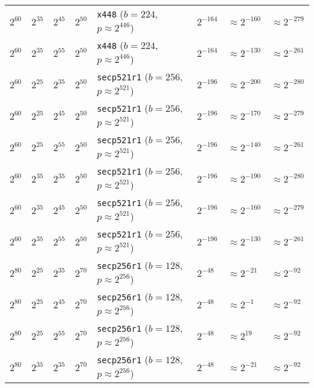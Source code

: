 \begin{table}[p]
{\begin{tabular}{@{}llllllll@{}}
$2^{60}$	&$2^{35}$	&$2^{45}$	&$2^{50}$	&\texttt{x448} ($b \!=\! 224$, \! $p \!\approx\! 2^{446}$)	&$2^{-164}$	&$\approx 2^{-160}$	& \cellcolor{green!25}$\approx 2^{-279}$	\\
$2^{60}$	&$2^{35}$	&$2^{55}$	&$2^{50}$	&\texttt{x448} ($b \!=\! 224$, \! $p \!\approx\! 2^{446}$)	&$2^{-164}$	&$\approx 2^{-130}$	& \cellcolor{green!25}$\approx 2^{-261}$	\\
\midrule
$2^{60}$	&$2^{25}$	&$2^{35}$	&$2^{50}$	&\texttt{secp521r1} ($b \!=\! 256$, \! $p \!\approx\! 2^{521}$)	&$2^{-196}$	&\cellcolor{green!25}$\approx 2^{-200}$	&\cellcolor{green!25}$\approx 2^{-280}$	\\
$2^{60}$	&$2^{25}$	&$2^{45}$	&$2^{50}$	&\texttt{secp521r1} ($b \!=\! 256$, \! $p \!\approx\! 2^{521}$)	&$2^{-196}$	&$\approx 2^{-170}$	& \cellcolor{green!25}$\approx 2^{-279}$	\\
$2^{60}$	&$2^{25}$	&$2^{55}$	&$2^{50}$	&\texttt{secp521r1} ($b \!=\! 256$, \! $p \!\approx\! 2^{521}$)	&$2^{-196}$	&$\approx 2^{-140}$	& \cellcolor{green!25}$\approx 2^{-261}$	\\
$2^{60}$	&$2^{35}$	&$2^{35}$	&$2^{50}$	&\texttt{secp521r1} ($b \!=\! 256$, \! $p \!\approx\! 2^{521}$)	&$2^{-196}$	&$\approx 2^{-190}$	& \cellcolor{green!25}$\approx 2^{-280}$	\\
$2^{60}$	&$2^{35}$	&$2^{45}$	&$2^{50}$	&\texttt{secp521r1} ($b \!=\! 256$, \! $p \!\approx\! 2^{521}$)	&$2^{-196}$	&$\approx 2^{-160}$	& \cellcolor{green!25}$\approx 2^{-279}$	\\
$2^{60}$	&$2^{35}$	&$2^{55}$	&$2^{50}$	&\texttt{secp521r1} ($b \!=\! 256$, \! $p \!\approx\! 2^{521}$)	&$2^{-196}$	&$\approx 2^{-130}$	& \cellcolor{green!25}$\approx 2^{-261}$	\\
\midrule[1pt]
$2^{80}$	&$2^{25}$	&$2^{35}$	&$2^{70}$	&\texttt{secp256r1} ($b \!=\! 128$, \! $p \!\approx\! 2^{256}$)	&$2^{-48}$	&$\approx 2^{-21}$	& \cellcolor{green!25}$\approx 2^{-92}$	\\
$2^{80}$	&$2^{25}$	&$2^{45}$	&$2^{70}$	&\texttt{secp256r1} ($b \!=\! 128$, \! $p \!\approx\! 2^{256}$)	&$2^{-48}$	&$\approx 2^{-1}$	& \cellcolor{green!25}$\approx 2^{-92}$	\\
$2^{80}$	&$2^{25}$	&$2^{55}$	&$2^{70}$	&\texttt{secp256r1} ($b \!=\! 128$, \! $p \!\approx\! 2^{256}$)	&$2^{-48}$	&$\approx 2^{19}$	& \cellcolor{green!25}$\approx 2^{-92}$	\\
$2^{80}$	&$2^{35}$	&$2^{35}$	&$2^{70}$	&\texttt{secp256r1} ($b \!=\! 128$, \! $p \!\approx\! 2^{256}$)	&$2^{-48}$	&$\approx 2^{-21}$	& \cellcolor{green!25}$\approx 2^{-92}$	\\

\end{tabular}}
\end{table}
